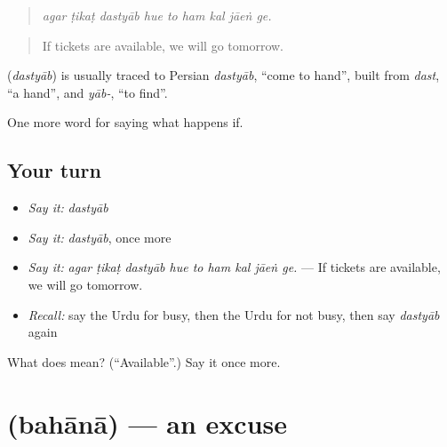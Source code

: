 \begin{quote}
        
\end{quote}

\begin{quote}
\emph{agar ṭikaṭ dastyāb hue to ham kal jāeṅ ge.}
\end{quote}

\begin{quote}
If tickets are available, we will go tomorrow.
\end{quote}

\begin{cousinweb}
\textbf{} (\emph{dastyāb}) is usually traced to Persian \emph{dastyāb}, \textquotedblleft{}come to hand\textquotedblright{}, built from \emph{dast}, \textquotedblleft{}a hand\textquotedblright{}, and \emph{yāb-}, \textquotedblleft{}to find\textquotedblright{}.
\end{cousinweb}

\begin{grammarlens}[title={What you've built}]
One more word for saying what happens if.
\end{grammarlens}

\subsection*{Your turn}
\begin{itemize}
\raggedright
  \item \emph{Say it:} \emph{dastyāb}
  \item \emph{Say it:} \emph{dastyāb}, once more
  \item \emph{Say it:} \emph{agar ṭikaṭ dastyāb hue to ham kal jāeṅ ge.} — If tickets are available, we will go tomorrow.
  \item \emph{Recall:} say the Urdu for busy, then the Urdu for not busy, then say \emph{dastyāb} again
\end{itemize}

\begin{tcolorbox}[breakable,colback=teal!4,colframe=teal!35!black,title={Before you move on}]
What does  mean? (\textquotedblleft{}Available\textquotedblright{}.) Say it once more.
\end{tcolorbox}
\section[\texorpdfstring{\ur{بہانہ} (bahānā)}{بہانہ (bahānā)}]{ (bahānā) — an excuse}


